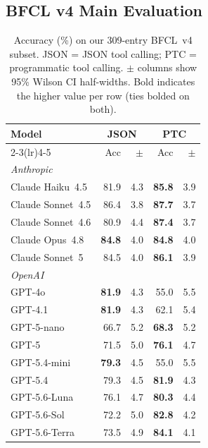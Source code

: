 \documentclass[11pt]{article}
\newcommand{\bfcl}{BFCL~v4}
\begin{document}
\subsection{BFCL v4 Main Evaluation}

\begin{table}[t]
\centering
\footnotesize
\setlength{\tabcolsep}{3pt}
\begin{tabular}{lrrrr}
\toprule
\textbf{Model} & \multicolumn{2}{c}{\textbf{JSON}} & \multicolumn{2}{c}{\textbf{PTC}} \\
\cmidrule(lr){2-3}\cmidrule(lr){4-5}
 & Acc & $\pm$ & Acc & $\pm$ \\
\midrule
\multicolumn{5}{l}{\textit{Anthropic}} \\
Claude Haiku~4.5  & 81.9 & 4.3 & \textbf{85.8} & 3.9 \\
Claude Sonnet~4.5 & 86.4 & 3.8 & \textbf{87.7} & 3.7 \\
Claude Sonnet~4.6 & 80.9 & 4.4 & \textbf{87.4} & 3.7 \\
Claude Opus~4.8   & \textbf{84.8} & 4.0 & \textbf{84.8} & 4.0 \\
Claude Sonnet~5   & 84.5 & 4.0 & \textbf{86.1} & 3.9 \\
\midrule
\multicolumn{5}{l}{\textit{OpenAI}} \\
GPT-4o            & \textbf{81.9} & 4.3 & 55.0 & 5.5 \\
GPT-4.1           & \textbf{81.9} & 4.3 & 62.1 & 5.4 \\
GPT-5-nano        & 66.7 & 5.2 & \textbf{68.3} & 5.2 \\
GPT-5             & 71.5 & 5.0 & \textbf{76.1} & 4.7 \\
GPT-5.4-mini      & \textbf{79.3} & 4.5 & 55.0 & 5.5 \\
GPT-5.4           & 79.3 & 4.5 & \textbf{81.9} & 4.3 \\
GPT-5.6-Luna      & 76.1 & 4.7 & \textbf{80.3} & 4.4 \\
GPT-5.6-Sol       & 72.2 & 5.0 & \textbf{82.8} & 4.2 \\
GPT-5.6-Terra     & 73.5 & 4.9 & \textbf{84.1} & 4.1 \\
\bottomrule
\end{tabular}
\caption{Accuracy (\%) on our 309-entry \bfcl{} subset. JSON = JSON tool calling;
PTC = programmatic tool calling. $\pm$ columns show 95\%
Wilson CI half-widths. Bold indicates the higher value per row (ties bolded on both).}
\label{tab:bfcl301}
\end{table}
\end{document}
